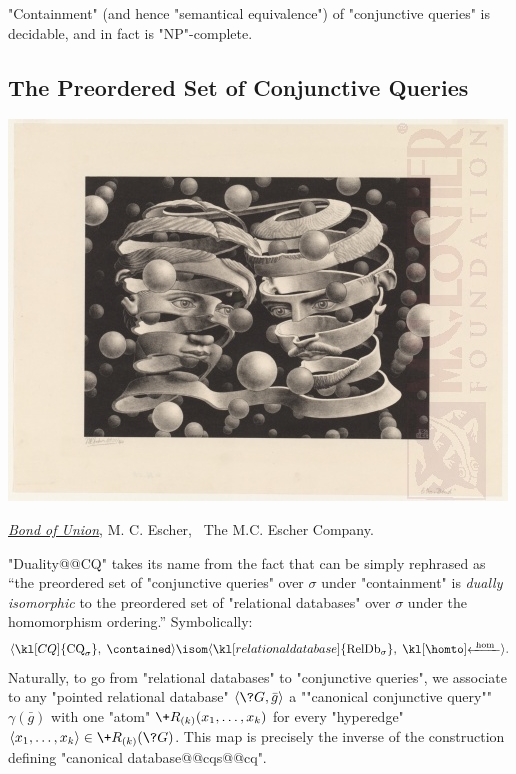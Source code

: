 \begin{corollary}
	\label{coro:prelim-db-containment-cq}
	"Containment" (and hence "semantical equivalence") of "conjunctive queries" is
	decidable, and in fact is "NP"-complete.
\end{corollary}


\subsection{The Preordered Set of Conjunctive Queries}
\label{sec:prelim-db-poset-cq}

\begin{marginfigure}
	\centering
	\includegraphics[width=\linewidth]{fig/escher/bound-of-union.jpg}
	\caption{\href{https://mcescher.com/gallery/most-popular/\#iLightbox[gallery\_image\_1]/23}{\emph{Bond of Union}}, M. C. Escher, \textcopyright~The M.C. Escher Company.}
\end{marginfigure}
"Duality@@CQ" takes its name from the fact that  can be simply rephrased as
``the preordered set of "conjunctive queries" over $\sigma$ under
"containment" is \emph{dually isomorphic} to the preordered set of "relational databases"
over $\sigma$ under the homomorphism ordering.'' Symbolically: 
\[
	\tup{\kl[CQ]{\textrm{CQ}_\sigma},\; \contained }
	\isom
	\tup{\kl[relational database]{\textrm{RelDb}_\sigma},\; \cohomto }.
\]
Naturally, to go from "relational databases" to "conjunctive queries",
we associate to any "pointed relational database" $\tup{\?G, \bar g}$
a ""canonical conjunctive query"" $\gamma(\bar g)$ with one "atom"
$\+R_{(k)}(x_1,\hdots,x_k)$ for every "hyperedge" $\tup{x_1,\hdots,x_k} \in \+R_{(k)}(\?G)$.
This map is precisely the inverse of the construction defining "canonical database@@cqs@@cq".


